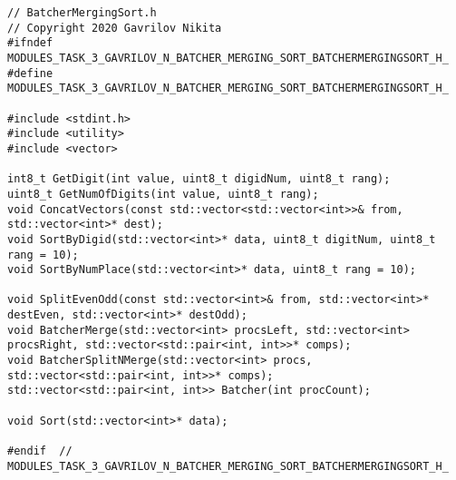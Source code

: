\documentclass{report}
\begin{document}
\begin{lstlisting}
// BatcherMergingSort.h
// Copyright 2020 Gavrilov Nikita
#ifndef MODULES_TASK_3_GAVRILOV_N_BATCHER_MERGING_SORT_BATCHERMERGINGSORT_H_
#define MODULES_TASK_3_GAVRILOV_N_BATCHER_MERGING_SORT_BATCHERMERGINGSORT_H_

#include <stdint.h>
#include <utility>
#include <vector>

int8_t GetDigit(int value, uint8_t digidNum, uint8_t rang);
uint8_t GetNumOfDigits(int value, uint8_t rang);
void ConcatVectors(const std::vector<std::vector<int>>& from, std::vector<int>* dest);
void SortByDigid(std::vector<int>* data, uint8_t digitNum, uint8_t rang = 10);
void SortByNumPlace(std::vector<int>* data, uint8_t rang = 10);

void SplitEvenOdd(const std::vector<int>& from, std::vector<int>* destEven, std::vector<int>* destOdd);
void BatcherMerge(std::vector<int> procsLeft, std::vector<int> procsRight, std::vector<std::pair<int, int>>* comps);
void BatcherSplitNMerge(std::vector<int> procs, std::vector<std::pair<int, int>>* comps);
std::vector<std::pair<int, int>> Batcher(int procCount);

void Sort(std::vector<int>* data);

#endif  // MODULES_TASK_3_GAVRILOV_N_BATCHER_MERGING_SORT_BATCHERMERGINGSORT_H_
\end{lstlisting}
\end{document}
